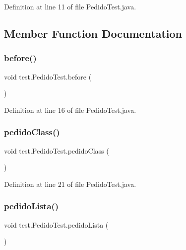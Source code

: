 Definition at line 11 of file Pedido\+Test.\+java.



\subsection{Member Function Documentation}
\mbox{\label{classtest_1_1_pedido_test_a224f87e09063855d190a6910ba42ce1a}} 
\subsubsection{\texorpdfstring{before()}{before()}}
{\footnotesize\ttfamily void test.\+Pedido\+Test.\+before (\begin{DoxyParamCaption}{ }\end{DoxyParamCaption})}



Definition at line 16 of file Pedido\+Test.\+java.

\mbox{\label{classtest_1_1_pedido_test_a543df9133d7a9040b22b94c1d66dbf2b}} 
\subsubsection{\texorpdfstring{pedido\+Class()}{pedidoClass()}}
{\footnotesize\ttfamily void test.\+Pedido\+Test.\+pedido\+Class (\begin{DoxyParamCaption}{ }\end{DoxyParamCaption})}



Definition at line 21 of file Pedido\+Test.\+java.

\mbox{\label{classtest_1_1_pedido_test_a2685ac9664dc2e9bfba5d65b5b94bfbd}} 
\subsubsection{\texorpdfstring{pedido\+Lista()}{pedidoLista()}}
{\footnotesize\ttfamily void test.\+Pedido\+Test.\+pedido\+Lista (\begin{DoxyParamCaption}{ }\end{DoxyParamCaption})}



